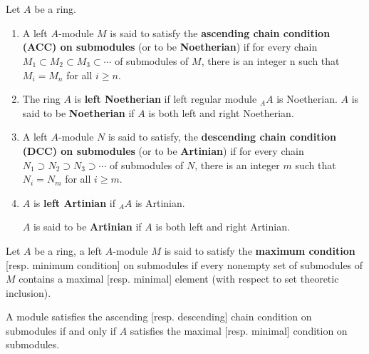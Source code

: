 \section{}
\begin{definition}
    Let $A$ be a ring.
    \begin{enumerate}
        \item
              A left $A$-module $M$ is said to satisfy the \textbf{ascending chain condition (ACC) on submodules} (or to be \textbf{Noetherian}) if for every chain $M_1 \subset M_2 \subset M_3 \subset \cdots$ of submodules of $M$, there is an integer n such that $M_{i}=M_{n}$ for all $i \geq n$.

        \item
              The ring $A$ is \textbf{left Noetherian} if left regular module ${}_AA$ is Noetherian.
              $A$ is said to be \textbf{Noetherian} if $A$ is both left and right Noetherian.

        \item
              A left $A$-module $N$ is said to satisfy, the \textbf{descending chain condition (DCC) on submodules} (or to be \textbf{Artinian}) if for every chain $N_1 \supset N_2 \supset N_3 \supset \cdots$ of submodules of $N$, there is an integer $m$ such that $N_{i}=N_m$ for all $i \geq m$.

        \item
              $A$ is \textbf{left Artinian } if ${}_A A$ is Artinian.

              $A$ is said to be \textbf{Artinian} if $A$ is both left and right Artinian.
    \end{enumerate}
\end{definition}

\begin{definition}
    Let $A$ be a ring, a left $A$-module $M$ is said to satisfy the \textbf{maximum condition} [resp. minimum condition] on submodules if every nonempty set of submodules of $M$ contains a maximal [resp. minimal] element (with respect to set theoretic inclusion).
\end{definition}






\begin{theorem}
    \label{thm: chain condition and m condition}
    A module satisfies the ascending [resp. descending] chain condition on submodules if and only if $A$ satisfies the maximal [resp. minimal] condition on submodules.
\end{theorem}

